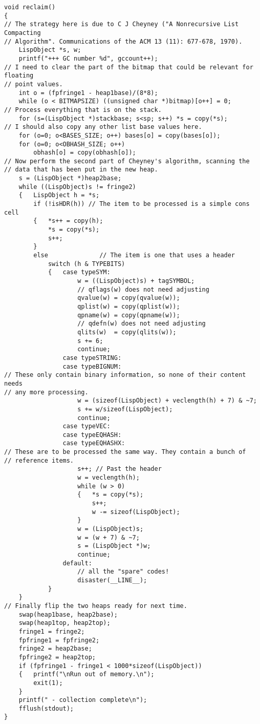{\begin{verbatim}
void reclaim()
{
// The strategy here is due to C J Cheyney ("A Nonrecursive List Compacting
// Algorithm". Communications of the ACM 13 (11): 677-678, 1970).
    LispObject *s, w;
    printf("+++ GC number %d", gccount++);
// I need to clear the part of the bitmap that could be relevant for floating
// point values.
    int o = (fpfringe1 - heap1base)/(8*8);
    while (o < BITMAPSIZE) ((unsigned char *)bitmap)[o++] = 0;
// Process everything that is on the stack.
    for (s=(LispObject *)stackbase; s<sp; s++) *s = copy(*s);
// I should also copy any other list base values here.
    for (o=0; o<BASES_SIZE; o++) bases[o] = copy(bases[o]);
    for (o=0; o<OBHASH_SIZE; o++)
        obhash[o] = copy(obhash[o]);
// Now perform the second part of Cheyney's algorithm, scanning the
// data that has been put in the new heap.
    s = (LispObject *)heap2base;
    while ((LispObject)s != fringe2)
    {   LispObject h = *s;
        if (!isHDR(h)) // The item to be processed is a simple cons cell
        {   *s++ = copy(h);
            *s = copy(*s);
            s++;
        }
        else              // The item is one that uses a header
            switch (h & TYPEBITS)
            {   case typeSYM:
                    w = ((LispObject)s) + tagSYMBOL;
                    // qflags(w) does not need adjusting
                    qvalue(w) = copy(qvalue(w));
                    qplist(w) = copy(qplist(w));
                    qpname(w) = copy(qpname(w));
                    // qdefn(w) does not need adjusting
                    qlits(w)  = copy(qlits(w));
                    s += 6;
                    continue;
                case typeSTRING:
                case typeBIGNUM:
// These only contain binary information, so none of their content needs
// any more processing.
                    w = (sizeof(LispObject) + veclength(h) + 7) & ~7;
                    s += w/sizeof(LispObject);
                    continue;
                case typeVEC:
                case typeEQHASH:
                case typeEQHASHX:
// These are to be processed the same way. They contain a bunch of
// reference items.
                    s++; // Past the header
                    w = veclength(h);
                    while (w > 0)
                    {   *s = copy(*s);
                        s++;
                        w -= sizeof(LispObject);
                    }
                    w = (LispObject)s;
                    w = (w + 7) & ~7;
                    s = (LispObject *)w;
                    continue;
                default:
                    // all the "spare" codes!
                    disaster(__LINE__);
            }
    }
// Finally flip the two heaps ready for next time.
    swap(heap1base, heap2base);
    swap(heap1top, heap2top);
    fringe1 = fringe2;
    fpfringe1 = fpfringe2;
    fringe2 = heap2base;
    fpfringe2 = heap2top;
    if (fpfringe1 - fringe1 < 1000*sizeof(LispObject))
    {   printf("\nRun out of memory.\n");
        exit(1);
    }
    printf(" - collection complete\n");
    fflush(stdout);
}


\end{verbatim}}
